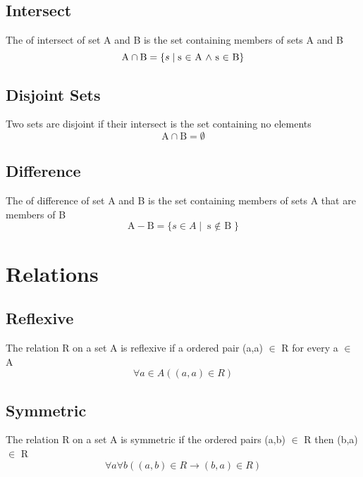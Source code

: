 \documentclass[12pt]{article}
\begin{document}
\subsection{Intersect}
The of intersect of set A and B 
is the set containing members of sets A and B
\begin{equation}
\mbox{A} \cap \mbox{B} = \{s\mid\text{s $\in$ A $\wedge$ s $\in$ B}\}$$
$$\end{equation}

\subsection{Disjoint Sets}
Two sets are disjoint if their intersect is the set containing no elements
\begin{equation}
\mbox{A} \cap \mbox{B} = \emptyset
\end{equation}

\subsection{Difference}
The of difference of set A and B 
is the set containing members of sets A 
that are members of B
\begin{equation}
\mbox{A} - \mbox{B} = \{ s \in A \mid\text{s $\not \in$ B} \}
\end{equation}

%
%
%
%
%
%
\pagebreak
\section{Relations}
\setcounter{equation}{0}

\subsection{Reflexive}
The relation R on a set A is reflexive 
if a ordered pair (a,a) $\in$ R for every a $\in$ A
\begin{equation}
\forall a \in A((a,a) \in R)
\end{equation}

\subsection{Symmetric}
The relation R on a set A is symmetric 
if the ordered pairs (a,b) $\in$ R 
then (b,a) $\in$ R
\begin{equation}
\forall a \forall b \left((a,b)\in R \rightarrow (b,a)\in R \right)
\end{equation}
\end{document}
